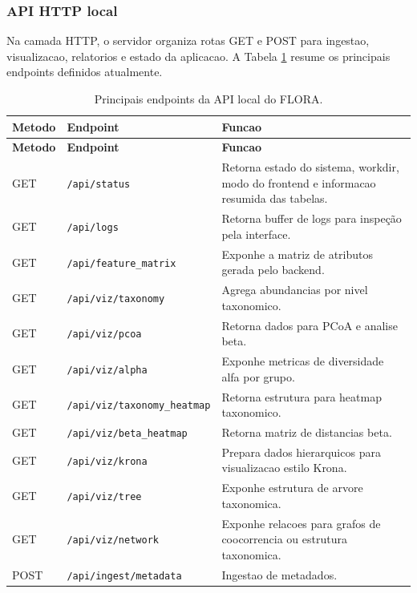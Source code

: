 \documentclass[12pt,a4paper]{article}
\begin{document}
\subsubsection{API HTTP local}

Na camada HTTP, o servidor organiza rotas GET e POST para ingestao, visualizacao, relatorios e estado da aplicacao. A Tabela \ref{tab:api_flora} resume os principais endpoints definidos atualmente.

\begin{longtable}{>{\raggedright\arraybackslash}p{2.2cm} >{\raggedright\arraybackslash}p{4.2cm} >{\raggedright\arraybackslash}p{7.4cm}}
    \caption{Principais endpoints da API local do FLORA.}
    \label{tab:api_flora}\\
    \toprule
    \textbf{Metodo} & \textbf{Endpoint} & \textbf{Funcao} \\
    \midrule
    \endfirsthead
    \toprule
    \textbf{Metodo} & \textbf{Endpoint} & \textbf{Funcao} \\
    \midrule
    \endhead
    GET & \texttt{/api/status} & Retorna estado do sistema, workdir, modo do frontend e informacao resumida das tabelas. \\
    GET & \texttt{/api/logs} & Retorna buffer de logs para inspeção pela interface. \\
    GET & \texttt{/api/feature\_matrix} & Exponhe a matriz de atributos gerada pelo backend. \\
    GET & \texttt{/api/viz/taxonomy} & Agrega abundancias por nivel taxonomico. \\
    GET & \texttt{/api/viz/pcoa} & Retorna dados para PCoA e analise beta. \\
    GET & \texttt{/api/viz/alpha} & Exponhe metricas de diversidade alfa por grupo. \\
    GET & \texttt{/api/viz/taxonomy\_heatmap} & Retorna estrutura para heatmap taxonomico. \\
    GET & \texttt{/api/viz/beta\_heatmap} & Retorna matriz de distancias beta. \\
    GET & \texttt{/api/viz/krona} & Prepara dados hierarquicos para visualizacao estilo Krona. \\
    GET & \texttt{/api/viz/tree} & Exponhe estrutura de arvore taxonomica. \\
    GET & \texttt{/api/viz/network} & Exponhe relacoes para grafos de coocorrencia ou estrutura taxonomica. \\
    POST & \texttt{/api/ingest/metadata} & Ingestao de metadados. \\

\end{longtable}
\end{document}
